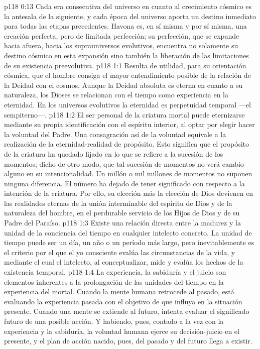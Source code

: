 \vs p118 0:13 Cada era consecutiva del universo en cuanto al crecimiento cósmico es la antesala de la siguiente, y cada época del universo aporta un destino inmediato para todas las etapas precedentes. Havona es, en sí misma y por sí misma, una creación perfecta, pero de limitada perfección; su perfección, que se expande hacia afuera, hacia los suprauniversos evolutivos, encuentra no solamente su destino cósmico en esta expansión sino también la liberación de las limitaciones de su existencia preevolutiva.
\vs p118 1:1 Resulta de utilidad, para su orientación cósmica, que el hombre consiga el mayor entendimiento posible de la relación de la Deidad con el cosmos. Aunque la Deidad absoluta es eterna en cuanto a su naturaleza, los Dioses se relacionan con el tiempo como experiencia en la eternidad. En los universos evolutivos la eternidad es perpetuidad temporal ---el  sempiterno---.
\vs p118 1:2 \pc El ser personal de la criatura mortal puede eternizarse mediante su propia identificación con el espíritu interior, al optar por elegir hacer la voluntad del Padre. Una consagración así de la voluntad equivale a la realización de la eternidad\hyp{}realidad de propósito. Esto significa que el propósito de la criatura ha quedado fijado en lo que se refiere a la sucesión de los momentos; dicho de otro modo, que tal sucesión de momentos no verá cambio alguno en su intencionalidad. Un millón o mil millones de momentos no suponen ninguna diferencia. El número ha dejado de tener significado con respecto a la intención de la criatura. Por ello, su elección más la elección de Dios devienen en las realidades eternas de la unión interminable del espíritu de Dios y de la naturaleza del hombre, en el perdurable servicio de los Hijos de Dios y de su Padre del Paraíso.
\vs p118 1:3 Existe una relación directa entre la madurez y la unidad de la conciencia del tiempo en cualquier intelecto concreto. La unidad de tiempo puede ser un día, un año o un período más largo, pero inevitablemente es el criterio por el que el yo consciente evalúa las circunstancias de la vida, y mediante el cual el intelecto, al conceptualizar, mide y evalúa los hechos de la existencia temporal.
\vs p118 1:4 La experiencia, la sabiduría y el juicio son elementos inherentes a la prolongación de las unidades del tiempo en la experiencia del mortal. Cuando la mente humana retrocede al pasado, está evaluando la experiencia pasada con el objetivo de que influya en la situación presente. Cuando una mente se extiende al futuro, intenta evaluar el significado futuro de una posible acción. Y habiendo, pues, contado a la vez con la experiencia y la sabiduría, la voluntad humana ejerce su decisión\hyp{}juicio en el presente, y el plan de acción nacido, pues, del pasado y del futuro llega a existir.
